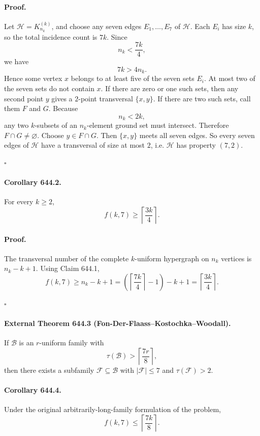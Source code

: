 \paragraph{Proof.}
Let $\mathcal H=K^{(k)}_{n_k}$, and choose any seven edges $E_1,\dots,E_7$ of $\mathcal H$.
Each $E_i$ has size $k$, so the total incidence count is $7k$.
Since
\[
 n_k < \frac{7k}{4},
\]
we have
\[
 7k > 4n_k.
\]
Hence some vertex $x$ belongs to at least five of the seven sets $E_i$.
At most two of the seven sets do not contain $x$.
If there are zero or one such sets, then any second point $y$ gives a $2$-point transversal $\{x,y\}$.
If there are two such sets, call them $F$ and $G$.
Because
\[
 n_k < 2k,
\]
any two $k$-subsets of an $n_k$-element ground set must intersect.  Therefore $F\cap G\neq\varnothing$.
Choose $y\in F\cap G$.
Then $\{x,y\}$ meets all seven edges.
So every seven edges of $\mathcal H$ have a transversal of size at most $2$, i.e. $\mathcal H$ has property $(7,2)$.

\hfill$\square$

\paragraph{Corollary 644.2.}
For every $k\ge 2$,
\[
 f(k,7)\ge \left\lceil \frac{3k}{4}\right\rceil.
\]

\paragraph{Proof.}
The transversal number of the complete $k$-uniform hypergraph on $n_k$ vertices is $n_k-k+1$.
Using Claim 644.1,
\[
 f(k,7)\ge n_k-k+1
 = \left(\left\lceil \frac{7k}{4}\right\rceil-1\right)-k+1
 = \left\lceil \frac{3k}{4}\right\rceil.
\]

\hfill$\square$

\paragraph{External Theorem 644.3 (Fon-Der-Flaass--Kostochka--Woodall).}
If $\mathcal B$ is an $r$-uniform family with
\[
\tau(\mathcal B) > \left\lceil \frac{7r}{8}\right\rceil,
\]
then there exists a subfamily $\mathcal F\subseteq \mathcal B$ with $|\mathcal F|\le 7$ and $\tau(\mathcal F)>2$.

\paragraph{Corollary 644.4.}
Under the original arbitrarily-long-family formulation of the problem,
\[
 f(k,7)\le \left\lceil \frac{7k}{8}\right\rceil.
\]

